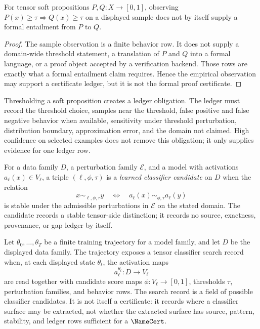 \begin{theorem}
\label{thm:large-model-empirical-entailment-not-formal-entailment}
For tensor soft propositions $P,Q:X\to[0,1]$, observing
$P(x)\ge\tau\Rightarrow Q(x)\ge\tau$ on a displayed sample does not by
itself supply a formal entailment from $P$ to $Q$.
\end{theorem}

\begin{proof}
The sample observation is a finite behavior row. It does not supply a
domain-wide threshold statement, a translation of $P$ and $Q$ into a
formal language, or a proof object accepted by a verification backend.
Those rows are exactly what a formal entailment claim requires. Hence the
empirical observation may support a certificate ledger, but it is not the
formal proof certificate.
\end{proof}

\begin{principle}
\label{prin:large-model-threshold-ledger-obligation}
Thresholding a soft proposition creates a ledger obligation. The ledger
must record the threshold choice, samples near the threshold, false
positive and false negative behavior when available, sensitivity under
threshold perturbation, distribution boundary, approximation error, and
the domain not claimed. High confidence on selected examples does not
remove this obligation; it only supplies evidence for one ledger row.
\end{principle}

\begin{definition}
\label{def:large-model-learned-classifier-candidate}
For a data family $D$, a perturbation family $\mathcal{E}$, and a model
with activations $a_\ell(x)\in V_\ell$, a triple $(\ell,\phi,\tau)$ is a
\emph{learned classifier candidate} on $D$ when the relation
$$
x\sim_{\ell,\phi,\tau}y
\quad\Longleftrightarrow\quad
a_\ell(x)\sim_{\phi,\tau}a_\ell(y)
$$
is stable under the admissible perturbations in $\mathcal{E}$ on the
stated domain. The candidate records a stable tensor-side distinction; it
records no source, exactness, provenance, or gap ledger by itself.
\end{definition}

\begin{definition}
\label{def:large-model-training-as-tensor-classifier-search}
Let $\theta_0,\ldots,\theta_T$ be a finite training trajectory for a
model family, and let $D$ be the displayed data family. The trajectory
exposes a tensor classifier search record when, at each displayed state
$\theta_t$, the activation maps
$$
a_\ell^{\theta_t}:D\to V_\ell
$$
are read together with candidate score maps $\phi:V_\ell\to[0,1]$,
thresholds $\tau$, perturbation families, and behavior rows. The search
record is a field of possible classifier candidates. It is not itself a
certificate: it records where a classifier surface may be extracted, not
whether the extracted surface has source, pattern, stability, and ledger
rows sufficient for a $\NameCert$.
\end{definition}

